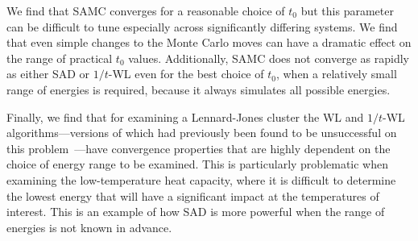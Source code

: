 \documentclass[letterpaper,twocolumn,amsmath,amssymb,pre,aps,10pt]{revtex4-1}
\begin{document}
We find that SAMC converges for a reasonable choice of
$t_0$ but this parameter can be difficult to tune especially across
significantly differing systems.  We find that even simple
changes to the Monte Carlo moves can have a dramatic effect on the
range of practical $t_0$ values.  Additionally, SAMC does not
converge as rapidly as either SAD or $1/t$-WL even for the best choice of $t_0$,
when a relatively small range of energies is required, because it always
simulates all possible energies.

Finally, we find that for examining a Lennard-Jones cluster the WL and
$1/t$-WL algorithms---versions of which had previously been found to
be unsuccessful on this problem~\cite{poulain2006performances}---have
convergence properties that are highly dependent on the choice of
energy range to be examined.  This is particularly problematic when
examining the low-temperature heat capacity, where it is difficult to
determine the lowest energy that will have a significant impact at the
temperatures of interest. This is an example of how SAD is more
powerful when the range of energies is not known in advance.

\end{document}
